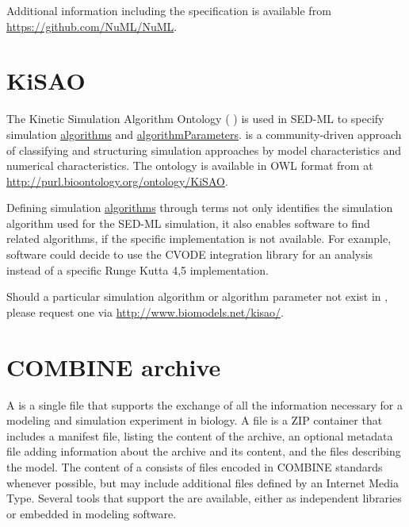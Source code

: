 Additional information including the  specification is available from \url{https://github.com/NuML/NuML}.

\section{KiSAO}
\label{sec:kisao}
The Kinetic Simulation Algorithm Ontology ( \citep{CWK+10}) is used in SED-ML to specify simulation \hyperref[class:algorithm]{algorithms} and \hyperref[class:algorithmParameter]{algorithmParameters}.  is a community-driven approach of classifying and structuring simulation approaches by model characteristics and numerical characteristics. The ontology is available in OWL format from  at \url{http://purl.bioontology.org/ontology/KiSAO}. 

Defining simulation \hyperref[class:algorithm]{algorithms} through  terms not only identifies the simulation algorithm used for the SED-ML simulation, it also enables software to find related algorithms, if the specific implementation is not available. For example, software could decide to use the CVODE integration library for an analysis instead of a specific Runge Kutta 4,5 implementation. 

Should a particular simulation algorithm or algorithm parameter not exist in , please request one via \url{http://www.biomodels.net/kisao/}.

\section{COMBINE archive}
\label{sec:archive}

A  \citep{Bergmann2014} is a single file that supports the exchange of all the information necessary for a modeling and simulation experiment in biology. A  file is a ZIP container that includes a manifest file, listing the content of the archive, an optional metadata file adding information about the archive and its content, and the files describing the model. The content of a  consists of files encoded in COMBINE standards whenever possible, but may include additional files defined by an Internet Media Type. Several tools that support the  are available, either as independent libraries or embedded in modeling software.

